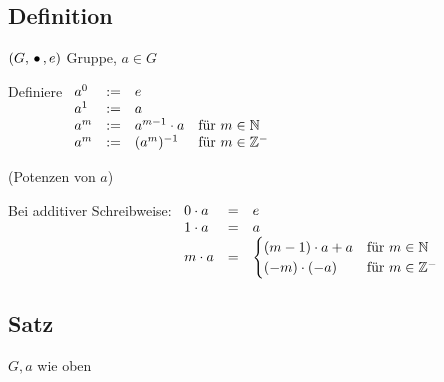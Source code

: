 \subsection[Definition: Potenzen]{Definition}

$(G, \,{\bullet}\,, e)$ Gruppe, $a \in G$

Definiere
$\begin{array}[t]{lcll}
a^0	&:=& e \\
a^1 &:=& a \\
a^m &:=& a^{m-1} \cdot a & \text{für } m \in \mathbb{N} \\
a^m &:=& (a^{m})^{-1} 	& \text{für } m \in \mathbb{Z}^-
\end{array}$

(Potenzen von $a$)

Bei additiver Schreibweise:
$\begin{array}[t]{lcl}
0 \cdot a &=& e \\
1 \cdot a &=& a \\
m \cdot a &=& 
\begin{cases}
(m-1) \cdot a + a & \text{für } m \in \mathbb{N} \\
(-m) \cdot (-a) 	& \text{für } m \in \mathbb{Z}^-
\end{cases}
\end{array}$

\subsection[Satz: Potenzgesetze]{Satz}
\label{potenzgesetze}
$G, a$ wie oben

